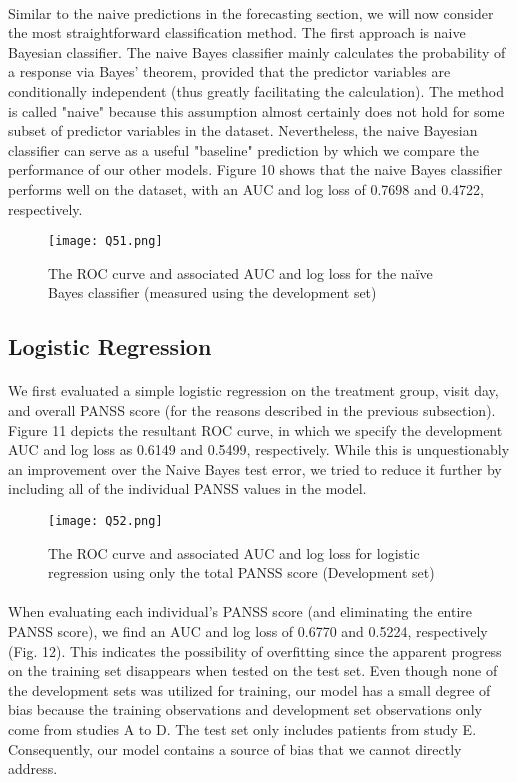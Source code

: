 \documentclass{article}
\begin{document}
	\paragraph{} Similar to the naive predictions in the forecasting section, we will now consider the most straightforward classification method. The first approach is naive Bayesian classifier. The naive Bayes classifier mainly calculates the probability of a response via Bayes' theorem, provided that the predictor variables are conditionally independent (thus greatly facilitating the calculation). The method is called "naive" because this assumption almost certainly does not hold for some subset of predictor variables in the dataset. Nevertheless, the naive Bayesian classifier can serve as a useful "baseline" prediction by which we compare the performance of our other models. Figure 10 shows that the naive Bayes classifier performs well on the dataset, with an AUC and log loss of 0.7698 and 0.4722, respectively.
\begin{figure}[H] 
\centering %
\texttt{[image: Q51.png]} 
\caption{The ROC curve and associated AUC and log loss for the naïve Bayes classifier (measured using the development set)}
\label{R} %
\end{figure} 	
 	\subsection{Logistic Regression}
 	\paragraph{} We first evaluated a simple logistic regression on the treatment group, visit day, and overall PANSS score (for the reasons described in the previous subsection). Figure 11 depicts the resultant ROC curve, in which we specify the development AUC and log loss as 0.6149 and 0.5499, respectively. While this is unquestionably an improvement over the Naive Bayes test error, we tried to reduce it further by including all of the individual PANSS values in the model.

\begin{figure}[H] 
\centering %
\texttt{[image: Q52.png]} 
\caption{The ROC curve and associated AUC and log loss for logistic regression using only the total PANSS score (Development set) }
\label{R} %
\end{figure} 
 \paragraph{}When evaluating each individual's PANSS score (and eliminating the entire PANSS score), we find an AUC and log loss of 0.6770 and 0.5224, respectively (Fig. 12). This indicates the possibility of overfitting since the apparent progress on the training set disappears when tested on the test set. Even though none of the development sets was utilized for training, our model has a small degree of bias because the training observations and development set observations only come from studies A to D. The test set only includes patients from study E. Consequently, our model contains a source of bias that we cannot directly address.
 
\end{document}
